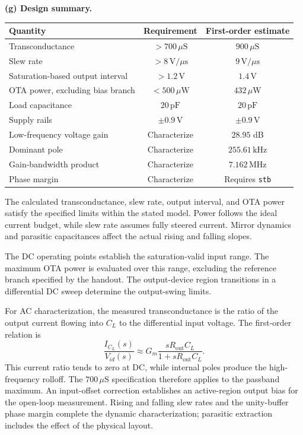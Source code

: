 \documentclass[12pt,letterpaper]{article}
\newcommand{\uS}{\,\mu\mathrm{S}}
\newcommand{\uW}{\,\mu\mathrm{W}}
\newcommand{\V}{\,\mathrm{V}}
\newcommand{\MHz}{\,\mathrm{MHz}}
\newcommand{\kHz}{\,\mathrm{kHz}}
\newcommand{\pF}{\,\mathrm{pF}}
\newcommand{\Vus}{\,\mathrm{V}/\mu\mathrm{s}}
\begin{document}
\begin{enumerate}
\newpage
\textbf{(g) Design summary.}
\begin{center}
\small
\setlength{\tabcolsep}{5pt}
\begin{tabular}{@{}lcc@{}}
\toprule
Quantity & Requirement & First-order estimate\\
\midrule
Transconductance & $>700\uS$ & $900\uS$\\
Slew rate & $>8\Vus$ & $9\Vus$\\
Saturation-based output interval & $>1.2\V$ & $1.4\V$\\
OTA power, excluding bias branch & $<500\uW$ & $432\uW$\\
Load capacitance & $20\pF$ & $20\pF$\\
Supply rails & $\pm0.9\V$ & $\pm0.9\V$\\
Low-frequency voltage gain & Characterize & $28.95$ dB\\
Dominant pole & Characterize & $255.61\kHz$\\
Gain-bandwidth product & Characterize & $7.162\MHz$\\
Phase margin & Characterize & Requires \texttt{stb}\\
\bottomrule
\end{tabular}
\end{center}
The calculated transconductance, slew rate, output interval, and
OTA power satisfy the specified limits within the stated model.
Power follows the ideal current budget, while slew rate assumes
fully steered current. Mirror dynamics and parasitic capacitances
affect the actual rising and falling slopes.

The DC operating points establish the saturation-valid input
range. The maximum OTA power is evaluated over this range,
excluding the reference branch specified by the handout. The
output-device region transitions in a differential DC sweep
determine the output-swing limits.

For AC characterization, the measured transconductance is the
ratio of the output current flowing into $C_L$ to the differential
input voltage. The first-order relation is
\[
\frac{I_{C_L}(s)}{V_{id}(s)}\approx
G_m\frac{sR_{\mathrm{out}}C_L}{1+sR_{\mathrm{out}}C_L}.
\]
This current ratio tends to zero at DC, while internal poles
produce the high-frequency rolloff. The $700\uS$ specification
therefore applies to the passband maximum. An input-offset
correction establishes an active-region output bias for the
open-loop measurement. Rising and falling slew rates and the
unity-buffer phase margin complete the dynamic characterization;
parasitic extraction includes the effect of the physical layout.


\end{enumerate}
\end{document}
